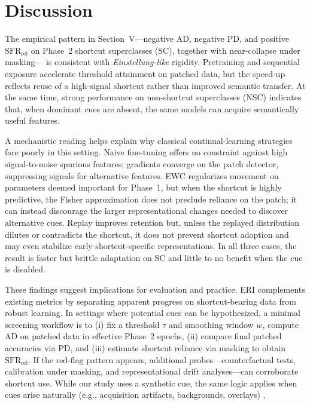 \documentclass[conference]{IEEEtran}
\begin{document}
\section{Discussion}

The empirical pattern in Section~V—negative \(\mathrm{AD}\), negative \(\mathrm{PD}\), and positive \(\mathrm{SFR}_{\mathrm{rel}}\) on Phase~2 shortcut superclasses (SC), together with near-collapse under masking— is consistent with \emph{Einstellung-like} rigidity. Pretraining and sequential exposure accelerate threshold attainment on patched data, but the speed-up reflects reuse of a high-signal shortcut rather than improved semantic transfer. At the same time, strong performance on non-shortcut superclasses (NSC) indicates that, when dominant cues are absent, the same models can acquire semantically useful features.

A mechanistic reading helps explain why classical continual-learning strategies fare poorly in this setting. Naive fine-tuning offers no constraint against high signal-to-noise spurious features; gradients converge on the patch detector, suppressing signals for alternative features. EWC regularizes movement on parameters deemed important for Phase~1, but when the shortcut is highly predictive, the Fisher approximation does not preclude reliance on the patch; it can instead discourage the larger representational changes needed to discover alternative cues. Replay improves retention but, unless the replayed distribution dilutes or contradicts the shortcut, it does not prevent shortcut adoption and may even stabilize early shortcut-specific representations. In all three cases, the result is faster but brittle adaptation on SC and little to no benefit when the cue is disabled.

These findings suggest implications for evaluation and practice. ERI complements existing metrics by separating apparent progress on shortcut-bearing data from robust learning. In settings where potential cues can be hypothesized, a minimal screening workflow is to (i) fix a threshold \(\tau\) and smoothing window \(w\), compute \(\mathrm{AD}\) on patched data in effective Phase~2 epochs, (ii) compare final patched accuracies via \(\mathrm{PD}\), and (iii) estimate shortcut reliance via masking to obtain \(\mathrm{SFR}_{\mathrm{rel}}\). If the red-flag pattern appears, additional probes—counterfactual tests, calibration under masking, and representational drift analyses—can corroborate shortcut use. While our study uses a synthetic cue, the same logic applies when cues arise naturally (e.g., acquisition artifacts, backgrounds, overlays) \cite{Hill2024TheRO,Hermann2023OnTF, Niu2022RoadblocksFT}.
\end{document}
